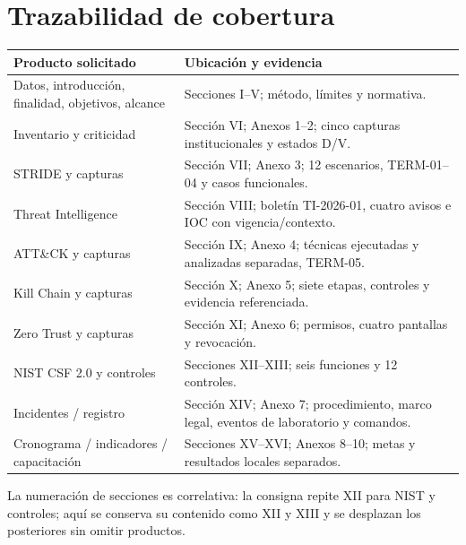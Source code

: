 \documentclass[10pt,a4paper]{article}
\newcommand{\cabecera}[1]{\textbf{#1}}
\begin{document}
\clearpage
\section*{Trazabilidad de cobertura}
\begin{tabularx}{\linewidth}{P{52mm}Y}
\toprule\cabecera{Producto solicitado} & \cabecera{Ubicación y evidencia}\\\midrule
Datos, introducción, finalidad, objetivos, alcance & Secciones I--V; método, límites y normativa.\\
Inventario y criticidad & Sección VI; Anexos 1--2; cinco capturas institucionales y estados D/V.\\
STRIDE y capturas & Sección VII; Anexo 3; 12 escenarios, TERM-01--04 y casos funcionales.\\
Threat Intelligence & Sección VIII; boletín TI-2026-01, cuatro avisos e IOC con vigencia/contexto.\\
ATT\&CK y capturas & Sección IX; Anexo 4; técnicas ejecutadas y analizadas separadas, TERM-05.\\
Kill Chain y capturas & Sección X; Anexo 5; siete etapas, controles y evidencia referenciada.\\
Zero Trust y capturas & Sección XI; Anexo 6; permisos, cuatro pantallas y revocación.\\
NIST CSF 2.0 y controles & Secciones XII--XIII; seis funciones y 12 controles.\\
Incidentes / registro & Sección XIV; Anexo 7; procedimiento, marco legal, eventos de laboratorio y comandos.\\
Cronograma / indicadores / capacitación & Secciones XV--XVI; Anexos 8--10; metas y resultados locales separados.\\\bottomrule
\end{tabularx}
La numeración de secciones es correlativa: la consigna repite XII para NIST y controles; aquí se conserva su contenido como XII y XIII y se desplazan los posteriores sin omitir productos.
\end{document}
